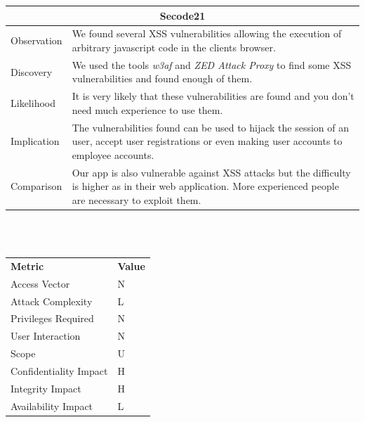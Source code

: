 \documentclass[headsepline,footsepline,footinclude=false,oneside,fontsize=11pt,paper=a4,listof=totoc,bibliography=totoc]{scrbook} %
\begin{document}
\begin{tabular}{ l|p{11cm}  }
	\hline
	\multicolumn{2}{c}{\textbf{Secode21}} \\
	\hline
	Observation   & We found several XSS vulnerabilities allowing the execution of arbitrary javascript code in the clients browser. \\
	Discovery  & We used the tools \textit{w3af} and \textit{ZED Attack Proxy} to find some XSS vulnerabilities and found enough of them. \\
	Likelihood & It is very likely that these vulnerabilities are found and you don't need much experience to use them. \\
	Implication    & The vulnerabilities found can be used to hijack the session of an user, accept user registrations or even making user accounts to employee accounts. \\
	Comparison & Our app is also vulnerable against XSS attacks but the difficulty is higher as in their web application. More experienced people are necessary to exploit them. \\
	\hline
\end{tabular}
\\
\vspace{0.5cm}
\\
\begin{center}
	\begin{tabular}{ll}
		\rowcolor[HTML]{34CDF9}
		{\color[HTML]{ECF4FF} \textbf{Metric}}        & {\color[HTML]{ECF4FF} \textbf{Value}} \\
		\rowcolor[HTML]{BBDAFF}
		{\color[HTML]{333333} Access Vector}          & {\color[HTML]{333333} } N              \\
		\rowcolor[HTML]{ECF4FF}
		{\color[HTML]{333333} Attack Complexity}      & {\color[HTML]{333333} } L              \\
		\rowcolor[HTML]{BBDAFF}
		{\color[HTML]{333333} Privileges Required}    & {\color[HTML]{333333} } N              \\
		\rowcolor[HTML]{ECF4FF}
		{\color[HTML]{333333} User Interaction}       & {\color[HTML]{333333} } N              \\
		\rowcolor[HTML]{BBDAFF}
		{\color[HTML]{333333} Scope}                  & {\color[HTML]{333333} } U              \\
		\rowcolor[HTML]{ECF4FF}
		{\color[HTML]{333333} Confidentiality Impact} & {\color[HTML]{333333} } H              \\
		\rowcolor[HTML]{BBDAFF}
		{\color[HTML]{333333} Integrity Impact}       & {\color[HTML]{333333} } H              \\
		\rowcolor[HTML]{ECF4FF}
		{\color[HTML]{333333} Availability Impact}    & {\color[HTML]{333333} } L
	\end{tabular}
\end{center}
\pagebreak
\end{document}
